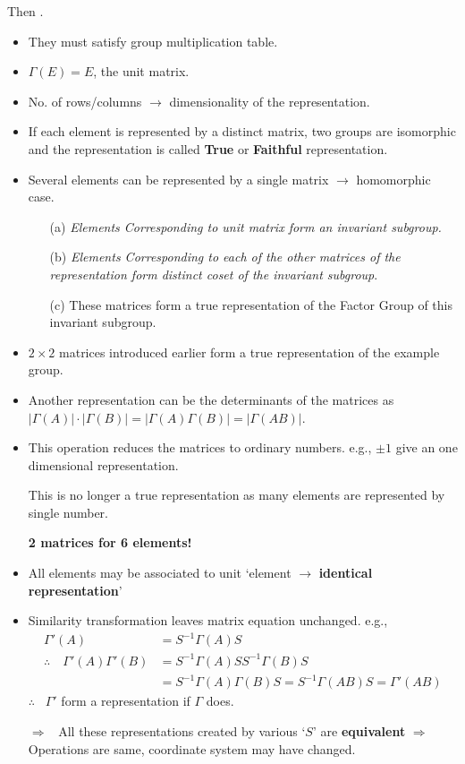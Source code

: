Then .
\begin{itemize}
\item They must satisfy group multiplication table.

\item $\Gamma(E)=E$, the unit matrix.

\item No. of rows/columns $\to$ dimensionality of the representation.

\item If each element is represented by a distinct matrix, two groups are isomorphic and the representation is called {\bf True} or {\bf Faithful} representation.

\item Several elements can be represented by a single matrix $\to$ homomorphic case.
\begin{itemize}
\item[(a)] {\em Elements Corresponding to unit matrix form an invariant subgroup.}

\item[(b)] {\em Elements Corresponding to each of the other matrices of the representation form distinct coset of the invariant subgroup}.

\item[(c)] These matrices form a true representation of the Factor Group of this invariant subgroup.
\end{itemize}

\item $2\times 2$ matrices introduced earlier form a true representation of the example group.

\item Another representation can be the determinants of the matrices as $|\Gamma(A)|\cdot |\Gamma(B)|=|\Gamma(A)\Gamma(B)|=|\Gamma(AB)|$.

\item This operation reduces the matrices to ordinary numbers. e.g., $\pm 1$ give an one dimensional representation.

This is no longer a true representation as many elements are represented by single number.

{\bf 2 matrices for 6 elements!}

\item All elements may be associated to unit `element $\to$ {\bf identical representation}'

\item Similarity transformation leaves matrix equation unchanged. e.g.,
\begin{align*}
\Gamma'(A) &= S^{-1}\Gamma(A)S\\
\therefore\quad \Gamma'(A)\Gamma'(B) &= S^{-1}\Gamma(A)SS^{-1}\Gamma(B)S\\
 &= S^{-1}\Gamma(A)\Gamma(B)S=S^{-1}\Gamma(AB)S=\Gamma'(AB)
\end{align*}
$\therefore$ \ $\Gamma'$ form a representation if $\Gamma$ does.

$\Rightarrow$ \ All these representations created by various `$S$' are {\bf equivalent} $\Rightarrow$ Operations are same, coordinate system may have changed.
\end{itemize}

